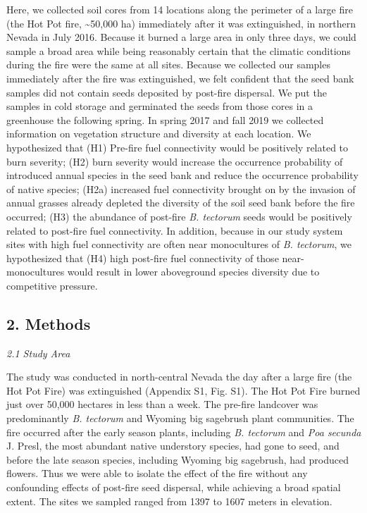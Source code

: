 \documentclass[
  12pt,
]{article}
\begin{document}
Here, we collected soil cores from 14 locations along the perimeter of a
large fire (the Hot Pot fire, \textasciitilde50,000 ha) immediately
after it was extinguished, in northern Nevada in July 2016. Because it
burned a large area in only three days, we could sample a broad area
while being reasonably certain that the climatic conditions during the
fire were the same at all sites. Because we collected our samples
immediately after the fire was extinguished, we felt confident that the
seed bank samples did not contain seeds deposited by post-fire
dispersal. We put the samples in cold storage and germinated the seeds
from those cores in a greenhouse the following spring. In spring 2017
and fall 2019 we collected information on vegetation structure and
diversity at each location. We hypothesized that (H1) Pre-fire fuel
connectivity would be positively related to burn severity; (H2) burn
severity would increase the occurrence probability of introduced annual
species in the seed bank and reduce the occurrence probability of native
species; (H2a) increased fuel connectivity brought on by the invasion of
annual grasses already depleted the diversity of the soil seed bank
before the fire occurred; (H3) the abundance of post-fire \emph{B.
tectorum} seeds would be positively related to post-fire fuel
connectivity. In addition, because in our study system sites with high
fuel connectivity are often near monocultures of \emph{B. tectorum}, we
hypothesized that (H4) high post-fire fuel connectivity of those
near-monocultures would result in lower aboveground species diversity
due to competitive pressure.

\hypertarget{methods}{%
\subsection{2. Methods}\label{methods}}

\emph{2.1 Study Area}

The study was conducted in north-central Nevada the day after a large
fire (the Hot Pot Fire) was extinguished (Appendix S1, Fig. S1). The Hot
Pot Fire burned just over 50,000 hectares in less than a week. The
pre-fire landcover was predominantly \emph{B. tectorum} and Wyoming big
sagebrush plant communities. The fire occurred after the early season
plants, including \emph{B. tectorum} and \emph{Poa secunda} J. Presl,
the most abundant native understory species, had gone to seed, and
before the late season species, including Wyoming big sagebrush, had
produced flowers. Thus we were able to isolate the effect of the fire
without any confounding effects of post-fire seed dispersal, while
achieving a broad spatial extent. The sites we sampled ranged from 1397
to 1607 meters in elevation.
\end{document}
